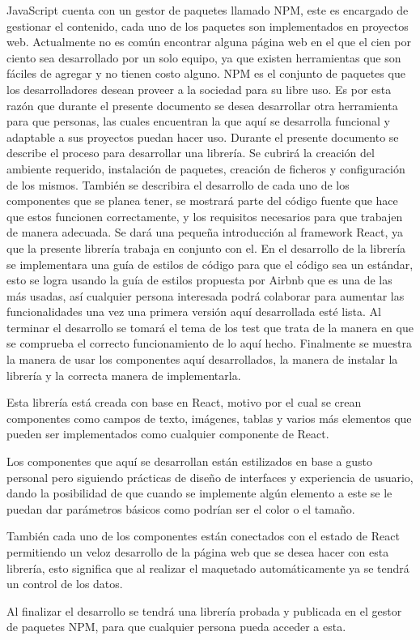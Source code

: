 JavaScript cuenta con un gestor de paquetes llamado NPM, este es encargado de gestionar el contenido, cada uno de los paquetes son  implementados en proyectos web.
Actualmente no es común encontrar alguna página web en el que el cien por ciento sea desarrollado por un solo equipo, ya que existen herramientas que son fáciles de agregar y no tienen costo alguno.
NPM es el conjunto de paquetes que los desarrolladores desean proveer a la sociedad para su libre uso.
Es por esta razón que durante el presente documento se desea desarrollar otra herramienta para que personas, las cuales encuentran la que aquí se desarrolla funcional y adaptable a sus proyectos puedan hacer uso.
Durante el presente documento se describe el proceso para desarrollar una librería. 
Se cubrirá la creación del ambiente requerido, instalación de paquetes, creación de ficheros y configuración de los mismos. 
También se describira el desarrollo de cada uno de los componentes que se planea tener, se mostrará parte del código fuente que hace que estos funcionen correctamente, y los requisitos necesarios para que trabajen de manera adecuada. 
Se dará una pequeña introducción al framework React, ya que la presente librería trabaja en conjunto con el.
En el desarrollo de la librería se implementara una guía de estilos de código para que el código sea un estándar, esto se logra usando la guía de estilos propuesta por Airbnb que es una de las más usadas, así cualquier persona interesada podrá colaborar para aumentar las funcionalidades una vez una primera versión aquí desarrollada esté lista.
Al terminar el desarrollo se tomará el tema de los test que trata de la manera en que se comprueba el correcto funcionamiento de lo aquí hecho.
Finalmente se muestra la manera de usar los componentes aquí desarrollados, la manera de instalar la librería y la correcta manera de implementarla.

Esta librería está creada con base en React, motivo por el cual se crean componentes como campos de texto, imágenes, tablas y varios más elementos que pueden ser implementados como cualquier componente de React. 

Los componentes que aquí se desarrollan están estilizados en base a gusto personal pero siguiendo prácticas de diseño de interfaces y experiencia de usuario, dando la posibilidad de que cuando se implemente algún elemento a este se le puedan dar parámetros básicos como podrían ser el color o el tamaño.

También cada uno de los componentes están conectados con el estado de React permitiendo un veloz desarrollo de la página web que se desea hacer con esta librería, esto significa que al realizar el maquetado automáticamente ya se tendrá un control de los datos.

Al finalizar el desarrollo se tendrá una librería probada y publicada en el gestor de paquetes NPM, para que cualquier persona pueda acceder a esta.